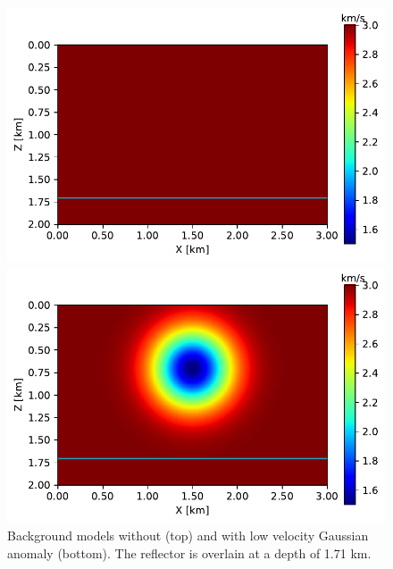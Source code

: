 \begin{figure}[h]
\centering
\includegraphics[width=0.8\linewidth]{Fig/veltrue-noanomaly.pdf}

\vspace*{-0.4cm}
\includegraphics[width=0.8\linewidth]{Fig/veltrue-anomaly.pdf}

\vspace*{-0.5cm}
\caption{Background models without (top) and with low velocity Gaussian anomaly (bottom). The reflector is overlain at a depth of 1.71 km.}
\label{fig:example1_models}
\end{figure}